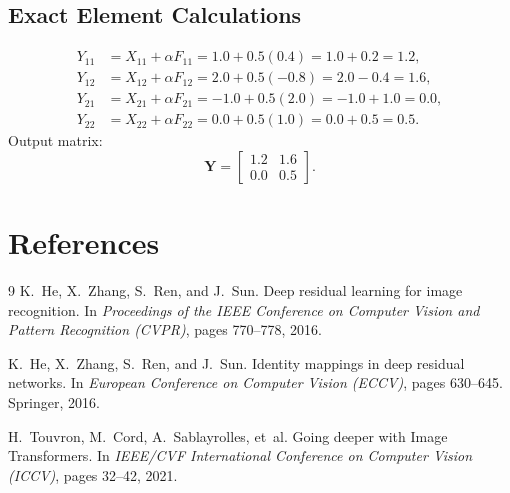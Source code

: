 \documentclass[11pt]{article}
\begin{document}
\subsection{Exact Element Calculations}
\begin{align}
Y_{11} &= X_{11} + \alpha F_{11} = 1.0 + 0.5(0.4) = 1.0 + 0.2 = 1.2, \\
Y_{12} &= X_{12} + \alpha F_{12} = 2.0 + 0.5(-0.8) = 2.0 - 0.4 = 1.6, \\
Y_{21} &= X_{21} + \alpha F_{21} = -1.0 + 0.5(2.0) = -1.0 + 1.0 = 0.0, \\
Y_{22} &= X_{22} + \alpha F_{22} = 0.0 + 0.5(1.0) = 0.0 + 0.5 = 0.5.
\end{align}
Output matrix:
\begin{equation}
\mathbf{Y} = \begin{bmatrix} 1.2 & 1.6 \\ 0.0 & 0.5 \end{bmatrix}.
\end{equation}

\section{References}
\label{sec:references}

\begin{thebibliography}{9}
K.~He, X.~Zhang, S.~Ren, and J.~Sun.
\newblock Deep residual learning for image recognition.
\newblock In \emph{Proceedings of the IEEE Conference on Computer Vision and Pattern Recognition (CVPR)}, pages 770--778, 2016.

K.~He, X.~Zhang, S.~Ren, and J.~Sun.
\newblock Identity mappings in deep residual networks.
\newblock In \emph{European Conference on Computer Vision (ECCV)}, pages 630--645. Springer, 2016.

H.~Touvron, M.~Cord, A.~Sablayrolles, et~al.
\newblock Going deeper with Image Transformers.
\newblock In \emph{IEEE/CVF International Conference on Computer Vision (ICCV)}, pages 32--42, 2021.
\end{thebibliography}
\end{document}
